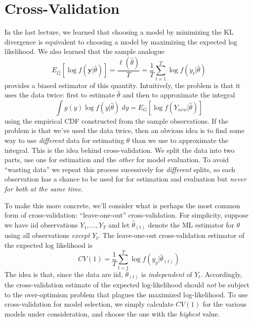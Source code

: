 \documentclass[12pt]{article}
\theoremstyle{definition}
\begin{document}
\section{Cross-Validation}
In the last lecture, we learned that choosing a model by minimizing the KL divergence is equivalent to choosing a model by maximizing the expected log likelihood. We also learned that the sample analogue
 $$E_{\widehat{G}}\left[\log f(\textbf{y}|\widehat{\theta}) \right]= \frac{\ell(\widehat{\theta})}{T}= \frac{1}{T} \sum_{t=1}^T \log f(y_t|\widehat{\theta})$$
provides a biased estimator of this quantity. Intuitively, the problem is that it uses the data twice: first to estimate $\widehat{\theta}$ and then to approximate the integral
	$$\int g(y) \log f(y|\widehat{\theta}) \; dy = E_G\left[\log f(Y_{new}|\widehat{\theta}) \right]$$
using the empirical CDF constructed from the sample observations. If the problem is that we've used the data twice, then an obvious idea is to find some way to use \emph{different} data for estimating $\theta$ than we use to approximate the integral. This is the idea behind cross-validation. We split the data into two parts, use one for estimation and the \emph{other} for model evaluation. To avoid ``wasting data'' we repeat this process sucessively for \emph{different} splits, so each observation has a chance to be used for for estimation and evaluation but \emph{never for both at the same time}.

To make this more concrete, we'll consider what is perhaps the most common form of cross-validation: ``leave-one-out'' cross-validation. For simplicity, suppose we have iid observations $Y_1, \hdots, Y_T$ and let $\widehat{\theta}_{(t)}$ denote the ML estimator for $\theta$ using all observations \emph{except} $Y_t$. The leave-one-out cross-validation estimator of the expected log likelihood is
	$$CV(1) = \frac{1}{T} \sum_{t=1}^T \log f(y_y|\widehat{\theta}_{(t)})$$
The idea is that, since the data are iid, $\widehat{\theta}_{(t)}$ is \emph{independent} of $Y_t$. Accordingly, the cross-validation estimate of the expected log-likelihood should \emph{not} be subject to the over-optimism problem that plagues the maximized log-likelihood. To use cross-validation for model selection, we simply calculate $CV(1)$ for the various models under consideration, and choose the one with the \emph{highest} value.
\end{document}
